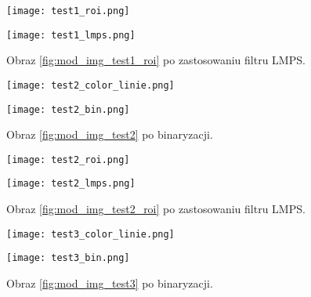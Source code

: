\begin{figure}[h]
	\begin{minipage}{0.48\textwidth}
		\centering
		\texttt{[image: test1\_roi.png]}
		\caption{Obraz \ref{fig:mod_img_test1_bin} po wyznaczeniu ROI.}
		\label{fig:mod_img_test1_roi}
	\end{minipage}
	\begin{minipage}{0.48\textwidth}
		\centering
		\texttt{[image: test1\_lmps.png]}
		\caption{Obraz \ref{fig:mod_img_test1_roi} po zastosowaniu filtru LMPS.}
		\label{fig:mod_img_test1_lmps}
	\end{minipage}
\end{figure}



\begin{figure}
	\begin{minipage}{0.48\textwidth}
		\centering
		\texttt{[image: test2\_color\_linie.png]}
		\caption{Obraz prostej drogi z refleksami wraz z naniesionymi środkami ciężkości oraz wykrytymi liniami.}
		\label{fig:mod_img_test2}
	\end{minipage}
	\begin{minipage}{0.48\textwidth}
		\centering
		\texttt{[image: test2\_bin.png]}
		\caption{Obraz \ref{fig:mod_img_test2} po binaryzacji.}
		\label{fig:mod_img_test2_bin}
	\end{minipage}
\end{figure}

\begin{figure}
	\begin{minipage}{0.48\textwidth}
		\centering
		\texttt{[image: test2\_roi.png]}
		\caption{Obraz \ref{fig:mod_img_test2_bin} po wyznaczeniu ROI.}
		\label{fig:mod_img_test2_roi}
	\end{minipage}
	\begin{minipage}{0.48\textwidth}
		\centering
		\texttt{[image: test2\_lmps.png]}
		\caption{Obraz \ref{fig:mod_img_test2_roi} po zastosowaniu filtru LMPS.}
		\label{fig:mod_img_test2_lmps}
	\end{minipage}
\end{figure}




\begin{figure}
	\begin{minipage}{0.48\textwidth}
		\centering
		\texttt{[image: test3\_color\_linie.png]}
		\caption{Obraz prostej drogi z refleksami wraz z naniesionymi środkami ciężkości oraz wykrytymi liniami.}
		\label{fig:mod_img_test3}
	\end{minipage}
	\begin{minipage}{0.48\textwidth}
		\centering
		\texttt{[image: test3\_bin.png]}
		\caption{Obraz \ref{fig:mod_img_test3} po binaryzacji.}
		\label{fig:mod_img_test3_bin}
	\end{minipage}
\end{figure}

